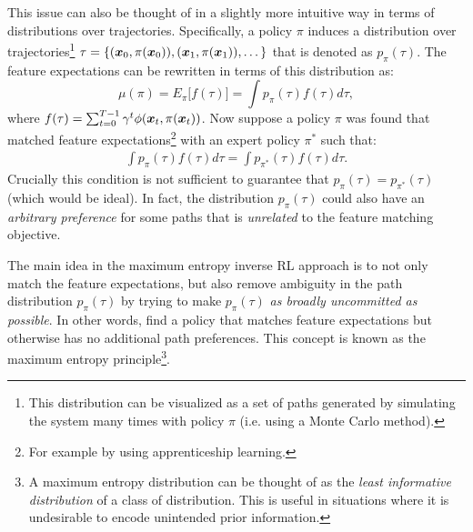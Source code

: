 This issue can also be thought of in a slightly more intuitive way in terms of distributions over trajectories. Specifically, a policy $\pi$ induces a distribution over trajectories\footnote{This distribution can be visualized as a set of paths generated by simulating the system many times with policy $\pi$ (i.e. using a Monte Carlo method).} $\tau = \{(\bm{x}_0, \pi(\bm{x}_0)), (\bm{x}_1, \pi(\bm{x}_1)), \dots \}$ that is denoted as $p_{\pi}(\tau)$. The feature expectations can be rewritten in terms of this distribution as:
\begin{equation*}
\mu(\pi) = E_{\pi}\big[f(\tau) \big] = \int p_{\pi}(\tau)f(\tau) d\tau,
\end{equation*}
where $f(\tau) = \sum_{t=0}^{T-1} \gamma^t \phi(\bm{x}_t, \pi(\bm{x}_t))$.
Now suppose a policy $\pi$ was found that matched feature expectations\footnote{For example by using apprenticeship learning.} with an expert policy $\pi^*$ such that:
\begin{equation*}
\begin{split}
\int p_{\pi}(\tau)f(\tau) d\tau = \int p_{\pi^*}(\tau)f(\tau) d\tau.
\end{split}
\end{equation*}
Crucially this condition is not sufficient to guarantee that $p_{\pi}(\tau) = p_{\pi^*}(\tau)$ (which would be ideal). In fact, the distribution $p_{\pi}(\tau)$ could also have an \textit{arbitrary preference} for some paths that is \textit{unrelated} to the feature matching objective.

The main idea in the maximum entropy inverse RL approach\cite{ZiebartMaasEtAl2008} is to not only match the feature expectations, but also remove ambiguity in the path distribution $p_{\pi}(\tau)$ by trying to make $p_{\pi}(\tau)$ \textit{as broadly uncommitted as possible}. In other words, find a policy that matches feature expectations but otherwise has no additional path preferences. This concept is known as the maximum entropy principle\footnote{A maximum entropy distribution can be thought of as the \textit{least informative distribution} of a class of distribution. This is useful in situations where it is undesirable to encode unintended prior information.}.

